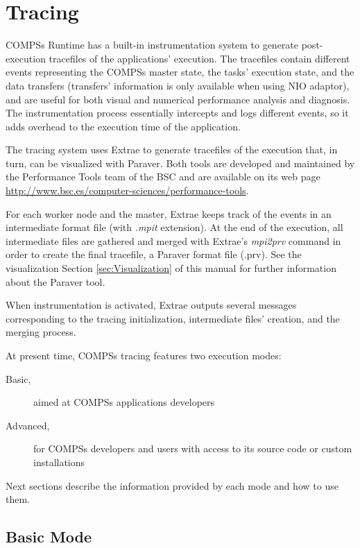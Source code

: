 \section{Tracing}
\label{sec:tracing}

COMPSs Runtime has a built-in instrumentation system to generate post-execution tracefiles of the applications' execution. The tracefiles
contain different events representing the COMPSs master state, the tasks' execution state, and the data transfers (transfers' information
is only available when using NIO adaptor), and are useful for both visual and numerical performance analysis and diagnosis. The 
instrumentation process essentially intercepts and logs different events, so it adds overhead to the execution time of the application.


The tracing system uses Extrae to generate tracefiles of the execution that, in turn, can be visualized with Paraver. Both tools are
developed and maintained by the Performance Tools team of the BSC and are available on its web page 
\url{http://www.bsc.es/computer-sciences/performance-tools}. 


For each worker node and the master, Extrae keeps track of the events in an intermediate format file (with \textit{.mpit} extension). At the
end of the execution, all intermediate files are gathered and merged with Extrae's \textit{mpi2prv} command in order to create the final
tracefile, a Paraver format file (.prv). See the visualization Section \ref{sec:Visualization} of this manual for further information about
the Paraver tool.


When instrumentation is activated, Extrae outputs several messages corresponding to the tracing initialization, intermediate files' creation,
and the merging process. 


At present time, COMPSs tracing features two execution modes:


\begin{description}
\item [Basic,] aimed at COMPSs applications developers
\item [Advanced,] for COMPSs developers and users with access to its source code or custom installations
\end{description}


Next sections describe the information provided by each mode and how to use them.


\subsection{Basic Mode}

